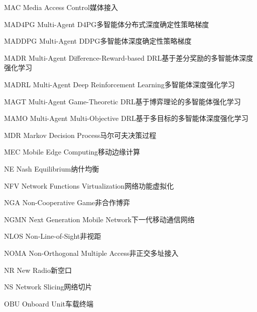 \begin{abbreviate}[0mm][18mm]
\item[MAC] Media Access Control\hspace{1em}媒体接入
\item[MAD4PG] Multi-Agent D4PG\hspace{1em}多智能体分布式深度确定性策略梯度
\item[MADDPG] Multi-Agent DDPG\hspace{1em}多智能体深度确定性策略梯度
\item[MADR] Multi-Agent Difference-Reward-based DRL\hspace{1em}基于差分奖励的多智能体深度强化学习
\item[MADRL] Multi-Agent Deep Reinforcement Learning\hspace{1em}多智能体深度强化学习
\item[MAGT] Multi-Agent Game-Theoretic DRL\hspace{1em}基于博弈理论的多智能体强化学习
\item[MAMO] Multi-Agent Multi-Objective DRL\hspace{1em}基于多目标的多智能体深度强化学习
\item[MDR] Markov Decision Process\hspace{1em}马尔可夫决策过程
\item[MEC] Mobile Edge Computing\hspace{1em}移动边缘计算
\item[NE] Nash Equilibrium\hspace{1em}纳什均衡
\item[NFV] Network Functions Virtualization\hspace{1em}网络功能虚拟化
\item[NGA] Non-Cooperative Game\hspace{1em}非合作博弈
\item[NGMN] Next Generation Mobile Network\hspace{1em}下一代移动通信网络
\item[NLOS] Non-Line-of-Sight\hspace{1em}非视距
\item[NOMA] Non-Orthogonal Multiple Access\hspace{1em}非正交多址接入
\item[NR] New Radio\hspace{1em}新空口
\item[NS] Network Slicing\hspace{1em}网络切片
\item[OBU] Onboard Unit\hspace{1em}车载终端

\end{abbreviate}
